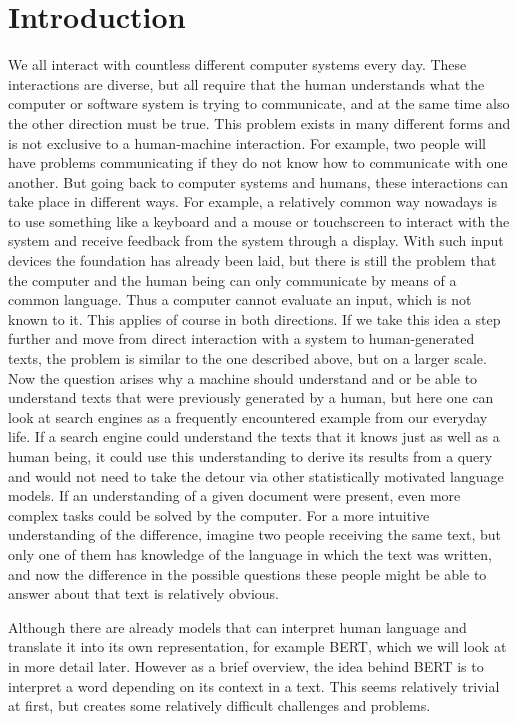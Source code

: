 \chapter{Introduction}
We all interact with countless different computer systems every day. These interactions are diverse, but all require that the human understands what the computer or software system is trying to communicate, and at the same time also the other direction must be true. This problem exists in many different forms and is not exclusive to a human-machine interaction. For example, two people will have problems communicating if they do not know how to communicate with one another. But going back to computer systems and humans, these interactions can take place in different ways. For example, a relatively common way nowadays is to use something like a keyboard and a mouse or touchscreen to interact with the system and receive feedback from the system through a display. With such input devices the foundation has already been laid, but there is still the problem that the computer and the human being can only communicate by means of a common language. Thus a computer cannot evaluate an input, which is not known to it. This applies of course in both directions. If we take this idea a step further and move from direct interaction with a system to human-generated texts, the problem is similar to the one described above, but on a larger scale. Now the question arises why a machine should understand and or be able to understand texts that were previously generated by a human, but here one can look at search engines as a frequently encountered example from our everyday life. If a search engine could understand the texts that it knows just as well as a human being, it could use this understanding to derive its results from a query and would not need to take the detour via other statistically motivated language models. If an understanding of a given document were present, even more complex tasks could be solved by the computer. For a more intuitive understanding of the difference, imagine two people receiving the same text, but only one of them has knowledge of the language in which the text was written, and now the difference in the possible questions these people might be able to answer about that text is relatively obvious.

Although there are already models that can interpret human language and translate it into its own representation, for example BERT, which we will look at in more detail later. However as a brief overview, the idea behind BERT is to interpret a word depending on its context in a text. This seems relatively trivial at first, but creates some relatively difficult challenges and problems.  

